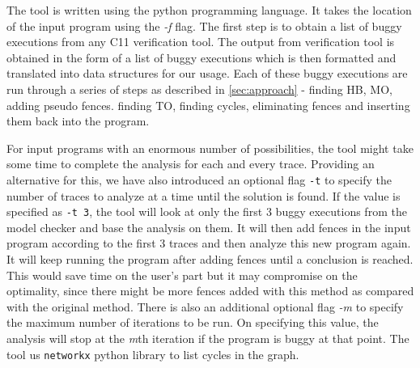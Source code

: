 \par
The tool is written using the python programming language. 
It takes the location of the input program using the \textit{-f} 
flag. The first step is to obtain a list of buggy executions 
from any C11 verification tool. 
The output from verification tool is obtained 
in the form of a list of buggy executions which is then formatted 
and translated into data structures for our usage. Each of these 
buggy executions are run through a series of steps as described in 
\textsection \ref{sec:approach} - finding HB, MO, adding pseudo fences. 
finding TO, finding cycles, eliminating fences and inserting them 
back into the program.

For input programs with an enormous number of possibilities, the 
tool might take some time to complete the analysis for each and 
every trace. Providing an alternative for this, we have also 
introduced an optional flag \texttt{-t} to specify the number 
of traces to analyze at a time until the solution is found. 
If the value is specified as \texttt{-t 3}, the tool will look 
at only the first 3 buggy executions from the model checker and 
base the analysis on them. It will then add fences in the input 
program according to the first 3 traces and then analyze this 
new program again. It will keep running the program after 
adding fences until a conclusion is reached. This would save 
time on the user's part but it may compromise on the optimality, 
since there might be more fences added with this method as compared 
with the original method. There is also an additional optional 
flag \textit{-m} to specify the maximum number of iterations to 
be run. On specifying this value, the analysis will stop at the 
\textit{m}th iteration if the program is buggy at that point.
The tool us \texttt{networkx} python library to list cycles in the 
graph.



